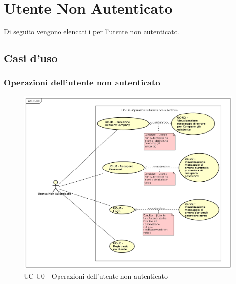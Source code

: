 \section{Utente Non Autenticato}

Di seguito vengono elencati i  per l'utente non autenticato.

\subsection{Casi d'uso}

\subsubsection{Operazioni dell'utente non autenticato}
  
    \begin{figure}[H]
      \begin{center}
        \includegraphics[width=12cm]{res/img/UCUtenti/UCUtenteNA/UC-U0.png}
      \caption{UC-U0 - Operazioni dell'utente non autenticato}
      \end{center} 
    \end{figure}    
    
